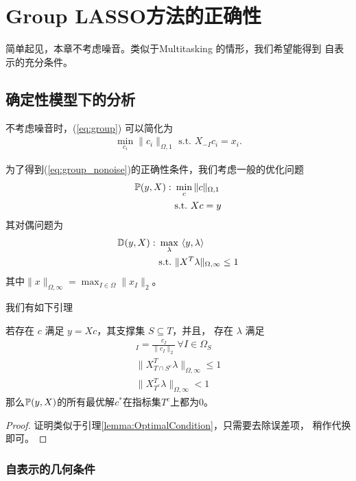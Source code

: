 \documentclass[main.tex]{subfiles}
\begin{document}
\chapter{Group LASSO方法的正确性}\label{chp:proof_group}
简单起见，本章不考虑噪音。类似于Multitasking 的情形，我们希望能得到
自表示的充分条件。

\section{确定性模型下的分析}
不考虑噪音时，(\ref{eq:group}) 可以简化为
\begin{align}
  \min_{c_i} \|c_i\|_{\Omega,1} \,\, \mbox{s.t.}\,\, X_{-I}c_i = x_i.
  \label{eq:group_nonoise}
\end{align}

为了得到(\ref{eq:group_nonoise})的正确性条件，我们考虑一般的优化问题
\begin{align}
  \P(y,X): \,\, & \min_c \| c\|_{\Omega,1} \\
                & \mbox{s.t.}\,\, Xc = y
  \label{eq:group_primal}
\end{align}
其对偶问题为 
\begin{align}
  \D(y,X): \,\, &\max_{\lambda} \,\, \langle y, \lambda\rangle \\
                & \mbox{s.t.}\,\, \|X^T\lambda\|_{\Omega,\infty} \leq 1
\end{align}
其中$\|x\|_{\Omega, \infty} = \max_{I \in \Omega} \|x_I\|_2$。

我们有如下引理 
\begin{lemma}
  \label{lem:prim_dual}
  若存在 $c$ 满足 $y = Xc$，其支撑集 $S \subseteq T$，并且，
  存在 $\lambda$ 满足
  \begin{align*}
    [X_{S}^T \lambda]_I = \frac{c_I}{\|c_I\|_2} \, \forall I \in \Omega_S\\
    \|X_{T\cap S^c}^T \lambda\|_{\Omega,\infty} \leq 1 \\
    \|X_{T^c}^T \lambda\|_{\Omega,\infty} < 1
  \end{align*}
  那么$\P(y,X)$的所有最优解$c^*$在指标集$T^c$上都为0。
\end{lemma}
\begin{proof}
  证明类似于引理\ref{lemma:OptimalCondition}，只需要去除误差项，
  稍作代换即可。
\end{proof}

\subsection{自表示的几何条件}
\end{document}
